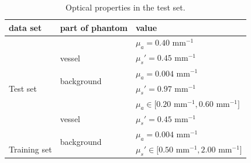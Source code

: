 \documentclass[journal]{IEEEtran}
\begin{document}
\begin{table}[ht!]
\vspace{2mm}
\caption {Optical properties in the test set.}
\vspace{-3mm}
\begin{center}
\bgroup
\def\arraystretch{1.15}
\begin{tabular}{ l | l | l } 
 \hline
\textbf{data set} & \textbf{part of phantom} & \textbf{value}\\
\hline \hline
\cellcolor{gray!10}& \cellcolor{gray!25} & \cellcolor{gray!25}$\mu_a=0.40$ mm$^{-1}$\\ 
\cellcolor{gray!10}& \multirow{-2}{*}{\cellcolor{gray!25} vessel} & \cellcolor{gray!25}$\mu_s'=0.45$ mm$^{-1}$\\ \cline{2-3}
\cellcolor{gray!10}& \multirow{2}{*}{background} & $\mu_a=0.004$ mm$^{-1}$\\ 
\multirow{-4}{*}{\cellcolor{gray!10} Test set}& & $\mu_s'=0.97$ mm$^{-1}$\\
 \hline \hline
\cellcolor{gray!10} & \cellcolor{gray!25} & \cellcolor{gray!25}$\mu_a\in\big[0.20$ mm$^{-1}, 0.60$ mm$^{-1}\big]$\\ 
\cellcolor{gray!10} & \multirow{-2}{*}{\cellcolor{gray!25} vessel} & \cellcolor{gray!25}$\mu_s'=0.45$ mm$^{-1}$\\ \cline{2-3}
\cellcolor{gray!10}& \multirow{2}{*}{background} & $\mu_a=0.004$ mm$^{-1}$\\ 
\multirow{-4}{*}{\cellcolor{gray!10} Training set} & & $\mu_s'\in\big[0.50$ mm$^{-1}, 2.00$ mm$^{-1}\big]$\\
 \hline
\end{tabular}
\egroup
\end{center}\label{tab:opt_prop}
\vspace{-4mm}
\end{table} 
\end{document}

